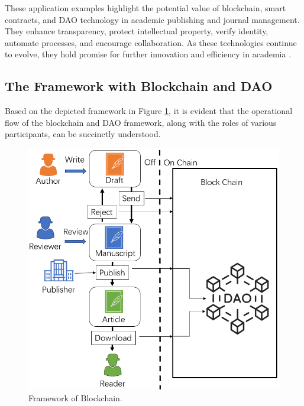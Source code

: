 \documentclass[lettersize,journal]{IEEEtran}
\begin{document}
These application examples highlight the potential value of blockchain, smart contracts, and DAO technology in academic publishing and journal management. They enhance transparency, protect intellectual property, verify identity, automate processes, and encourage collaboration. As these technologies continue to evolve, they hold promise for further innovation and efficiency in academia \cite{vacca2021systematic}.


\subsection{The Framework with Blockchain and DAO}

Based on the depicted framework in Figure \ref{fig:frameworkofblockchain}, it is evident that the operational flow of the blockchain and DAO framework, along with the roles of various participants, can be succinctly understood. 

\begin{figure}[h!]
  \centering
  \includegraphics[width=\linewidth]{assets/workflow.png}
  \caption{Framework of Blockchain.}
  \label{fig:frameworkofblockchain}
\end{figure}
\end{document}
